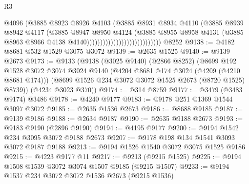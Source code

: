 \begin{lexlean}{R3}
\begin{coremodule}
                                                @4096
                                                (@3885
                                                  @8923
                                                  @8926
                                                  @4103
                                                  (@3885
                                                    @8931
                                                    @8934
                                                    @4110
                                                    (@3885
                                                      @8939
                                                      @8942
                                                      @4117
                                                      (@3885
                                                        @8947
                                                        @8950
                                                        @4124
                                                        (@3885
                                                          @8955
                                                          @8958
                                                          @4131
                                                          (@3885
                                                            @8963
                                                            @8966
                                                            @4138
                                                            @4140))))))))))))))))))))))))))))
    @8252
@9138 := @4182 @8681 @532 @1529 @3075 @3072
@9139 := @2635 @1525
@9140 := @9139 @2673
@9173 := @9133
    (@9138
      (@3025 @9140)
      (@2866 @8252)
      (@8699
        @192
        @1528
        @3072
        @3074
        @3024
        @9140
        (@4204 @8681 @174 @3024 (@4209 (@4210 @8681 @174)))
        (@8699 @1526 @234 @3072 @3072 @1525 @2673 (@8720 @1525) @8739))
      (@4234 @3023 @370))
@9174 := @314 @8759
@9177 := @3479 (@3483 @9174) @3486
@9178 := @4240 @9177
@9183 := @9178 @251 @1369 @1544 @3097 @3072
@9185 := @2635 @1536 @2673
@9186 := @8688 @9185
@9187 := @9139 @9186
@9188 := @2634 @9187
@9190 := @2635 @9188 @2673
@9193 := @9183 @9190 (@2896 @9190)
@9194 := @4195 @9177
@9200 := @9194 @1542 @234 @3095 @3072 @9188 @2673
@9207 := @9178 @198 @134 @1541 @3093 @3072 @9187 @9188
@9213 := @9194 @1526 @1540 @3072 @3075 @1525 @9186
@9215 := @4223 @9177 @11
@9217 := @9213 (@9215 @1525)
@9225 := @9194 @1508 @1539 @3072 @3074 @1507 @9185 (@9215 @1507)
@9233 := @9194 @1537 @234 @3072 @3072 @1536 @2673 (@9215 @1536)

\end{coremodule}
\end{lexlean}
